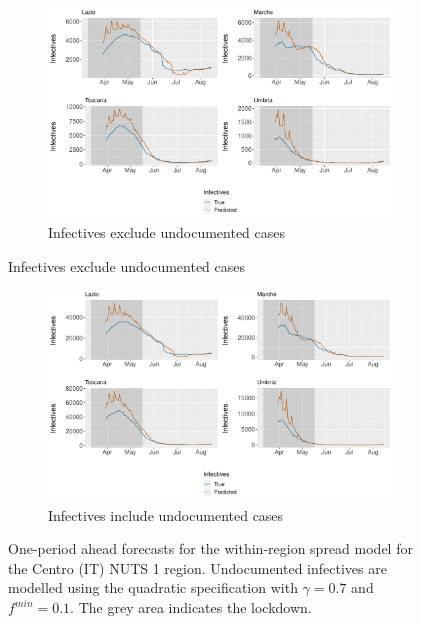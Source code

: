 \documentclass[12pt]{article}
\begin{document}
\begin{appendices}
		\begin{figure}[H]
    	    \centering
    	    \begin{subfigure}{\textwidth}
    	      \centering
    	      \includegraphics[width=0.92\linewidth]{output/model_within_lag14_forecast_start20_Centro (IT)_rolling.pdf}
    	      \caption{Infectives exclude undocumented cases}
    	      \label{fig:forecast_within_centro_regular}
    	    \end{subfigure}
        \end{figure}
        \begin{figure}[H]\ContinuedFloat
    	    \begin{subfigure}{\textwidth}
    	      \centering
    	      \includegraphics[width=0.92\linewidth]{output/model_within_lag14_forecast_start20_Centro (IT)_UndocQuadratic_rolling.pdf}
    	      \caption{Infectives include undocumented cases}
    	      \label{fig:forecast_within_centro_undoc}
    	    \end{subfigure}
    	    \caption{One-period ahead forecasts for the within-region spread model for the Centro (IT) NUTS 1 region. Undocumented infectives are modelled using the quadratic specification with $\gamma = 0.7$ and $f^{min}=0.1$. The grey area indicates the lockdown.}
    	    \label{fig:forecast_within_centro}
        \end{figure}
		

\end{appendices}
\end{document}
